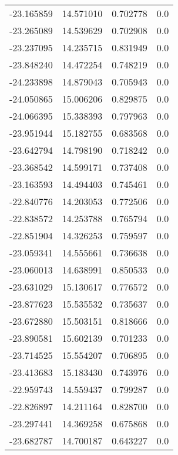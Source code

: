 \begin{tabular}{rrrr}
      -23.165859 &        14.571010 &    0.702778 &   0.0 \\
      -23.265089 &        14.539629 &    0.702908 &   0.0 \\
      -23.237095 &        14.235715 &    0.831949 &   0.0 \\
      -23.848240 &        14.472254 &    0.748219 &   0.0 \\
      -24.233898 &        14.879043 &    0.705943 &   0.0 \\
      -24.050865 &        15.006206 &    0.829875 &   0.0 \\
      -24.066395 &        15.338393 &    0.797963 &   0.0 \\
      -23.951944 &        15.182755 &    0.683568 &   0.0 \\
      -23.642794 &        14.798190 &    0.718242 &   0.0 \\
      -23.368542 &        14.599171 &    0.737408 &   0.0 \\
      -23.163593 &        14.494403 &    0.745461 &   0.0 \\
      -22.840776 &        14.203053 &    0.772506 &   0.0 \\
      -22.838572 &        14.253788 &    0.765794 &   0.0 \\
      -22.851904 &        14.326253 &    0.759597 &   0.0 \\
      -23.059341 &        14.555661 &    0.736638 &   0.0 \\
      -23.060013 &        14.638991 &    0.850533 &   0.0 \\
      -23.631029 &        15.130617 &    0.776572 &   0.0 \\
      -23.877623 &        15.535532 &    0.735637 &   0.0 \\
      -23.672880 &        15.503151 &    0.818666 &   0.0 \\
      -23.890581 &        15.602139 &    0.701233 &   0.0 \\
      -23.714525 &        15.554207 &    0.706895 &   0.0 \\
      -23.413683 &        15.183430 &    0.743976 &   0.0 \\
      -22.959743 &        14.559437 &    0.799287 &   0.0 \\
      -22.826897 &        14.211164 &    0.828700 &   0.0 \\
      -23.297441 &        14.369258 &    0.675868 &   0.0 \\
      -23.682787 &        14.700187 &    0.643227 &   0.0 \\

\end{tabular}
